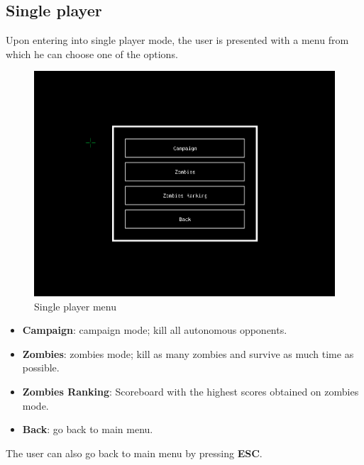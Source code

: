 \documentclass{article}
\theoremstyle{remark}
\begin{document}
\subsection{Single player}
Upon entering into single player mode, the user is presented with a menu from which he can choose one of the options. \par
\begin{figure}[H] \centering
	\includegraphics[scale=0.45]{singleplayer01}
	\caption{Single player menu}
\end{figure}
\begin{itemize}
	\item \textbf{Campaign}: campaign mode; kill all autonomous opponents.
	\item \textbf{Zombies}: zombies mode; kill as many zombies and survive as much time as possible.
	\item \textbf{Zombies Ranking}: Scoreboard with the highest scores obtained on zombies mode.
	\item \textbf{Back}: go back to main menu.
\end{itemize}
The user can also go back to main menu by pressing \textbf{ESC}.
\pagebreak
\end{document}
